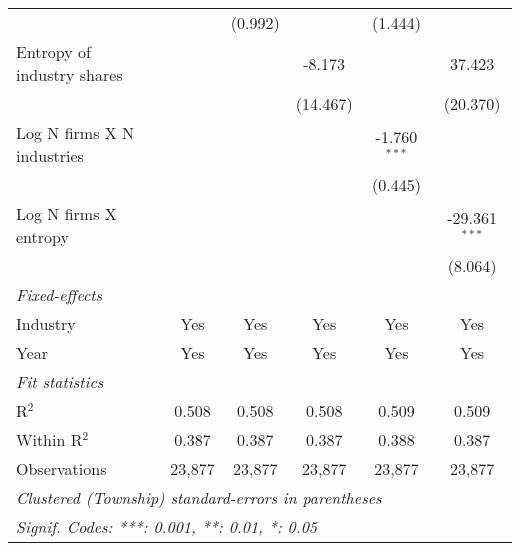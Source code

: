 \begin{tabular}{lccccc}
                                        &                  & (0.992)          &                  & (1.444)          &   \\   
   Entropy of industry shares           &                  &                  & -8.173           &                  & 37.423\\   
                                        &                  &                  & (14.467)         &                  & (20.370)\\   
   Log N firms X N industries           &                  &                  &                  & -1.760$^{***}$   &   \\   
                                        &                  &                  &                  & (0.445)          &   \\   
   Log N firms X entropy                &                  &                  &                  &                  & -29.361$^{***}$\\   
                                        &                  &                  &                  &                  & (8.064)\\   
   \midrule
   \emph{Fixed-effects}\\
   Industry                             & Yes              & Yes              & Yes              & Yes              & Yes\\  
   Year                                 & Yes              & Yes              & Yes              & Yes              & Yes\\  
   \midrule
   \emph{Fit statistics}\\
   R$^2$                                & 0.508            & 0.508            & 0.508            & 0.509            & 0.509\\  
   Within R$^2$                         & 0.387            & 0.387            & 0.387            & 0.388            & 0.387\\  
   Observations                         & 23,877           & 23,877           & 23,877           & 23,877           & 23,877\\  
   \midrule \midrule
   \multicolumn{6}{l}{\emph{Clustered (Township) standard-errors in parentheses}}\\
   \multicolumn{6}{l}{\emph{Signif. Codes: ***: 0.001, **: 0.01, *: 0.05}}\\
\end{tabular}
\par\endgroup
